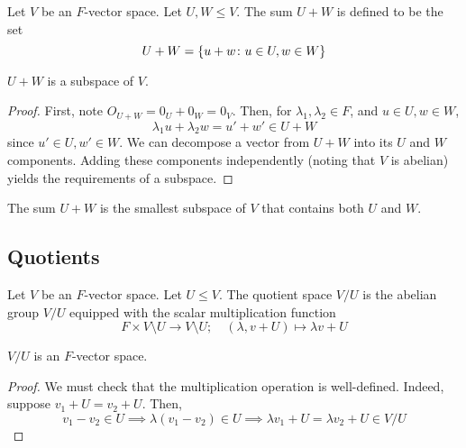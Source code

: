 \begin{definition}
	Let \( V \) be an \( F \)-vector space.
	Let \( U, W \leq V \).
	The sum \( U + W \) is defined to be the set
	\[
		U + W = \qty{ u + w \colon u \in U, w \in W }
	\]
\end{definition}
\begin{proposition}
	\( U + W \) is a subspace of \( V \).
\end{proposition}
\begin{proof}
	First, note \( O_{U+W} = 0_U + 0_W = 0_V \).
	Then, for \( \lambda_1, \lambda_2 \in F \), and \( u \in U, w \in W \),
	\[
		\lambda_1 u + \lambda_2 w = u' + w' \in U + W
	\]
	since \( u' \in U, w' \in W \).
	We can decompose a vector from \( U + W \) into its \( U \) and \( W \) components.
	Adding these components independently (noting that \( V \) is abelian) yields the requirements of a subspace.
\end{proof}
\begin{proposition}
	The sum \( U + W \) is the smallest subspace of \( V \) that contains both \( U \) and \( W \).
\end{proposition}

\subsection{Quotients}
\begin{definition}
	Let \( V \) be an \( F \)-vector space.
	Let \( U \leq V \).
	The quotient space \( V / U \) is the abelian group \( V / U \) equipped with the scalar multiplication function
	\[
		F \times V \setminus U \to V \setminus U;\quad (\lambda, v + U) \mapsto \lambda v + U
	\]
\end{definition}
\begin{proposition}
	\( V / U \) is an \( F \)-vector space.
\end{proposition}
\begin{proof}
	We must check that the multiplication operation is well-defined.
	Indeed, suppose \( v_1 + U = v_2 + U \).
	Then,
	\[
		v_1 - v_2 \in U \implies \lambda (v_1 - v_2) \in U \implies \lambda v_1 + U = \lambda v_2 + U \in V / U
	\]
\end{proof}
